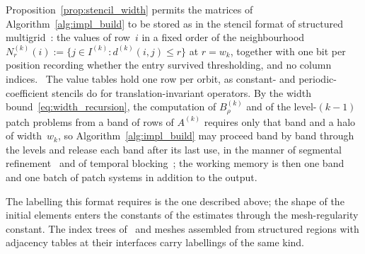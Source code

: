 \documentclass[hidelinks]{siamart}
\theoremstyle{nonumberplain}
\numberwithin{theorem}{section}
\begin{document}
\begin{remark}[Realization]\label{rem:realization}
Proposition~\ref{prop:stencil_width} permits the matrices of
Algorithm~\ref{alg:impl_build} to be stored as in the stencil format of
structured multigrid~\cite{hypre2006,dendy1982blackbox}: the values of
row~$i$ in a fixed order of the neighbourhood
$N^{(k)}_r(i) := \{ j \in I^{(k)} : d^{(k)}(i,j) \leq r \}$ at $r = w_k$,
together with one bit per position recording whether the entry survived
thresholding, and no column indices.%
\ The value tables hold one row per
orbit, as constant- and periodic-coefficient stencils do for
translation-invariant operators.  By the width
bound~\eqref{eq:width_recursion}, the computation of
$B^{(k)}_\rho$ and of the level-$(k{-}1)$ patch problems from a band of
rows of $A^{(k)}$ requires only that band and a halo of width~$w_k$, so
Algorithm~\ref{alg:impl_build} may proceed band by band through the
levels and release each band after its last use, in the manner of
segmental refinement~\cite{brandt1994segmental,adams2016segmental} and
of temporal blocking~\cite{wonnacott2002timeskewing}; the working memory
is then one band and one batch of patch systems in addition to the
output.

The labelling this format requires is the one described above; the
shape of the initial elements enters the constants of the estimates
through the mesh-regularity constant.  The index trees
of~\cite{owhadi2017} and meshes assembled from structured regions with
adjacency tables at their interfaces carry labellings of the same kind.

\end{remark}
\end{document}

